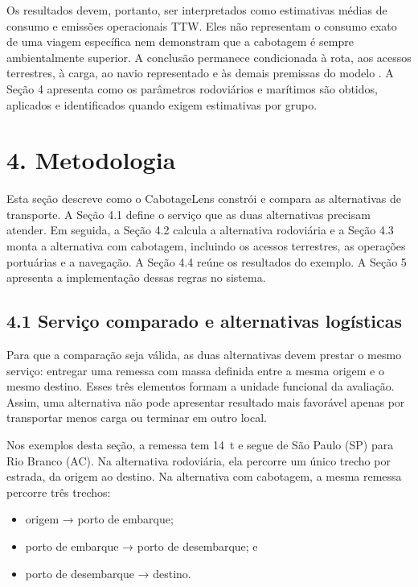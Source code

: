 \documentclass[brazil,]{article}
\providecommand{\tightlist}{%
  \setlength{\itemsep}{0pt}\setlength{\parskip}{0pt}}
\let\oldsection\section
\renewcommand{\section}{\Needspace{14\baselineskip}\oldsection}
\let\oldsubsection\subsection
\renewcommand{\subsection}{\Needspace{12\baselineskip}\oldsubsection}
\begin{document}
Os resultados devem, portanto, ser interpretados como estimativas médias
de consumo e emissões operacionais TTW. Eles não representam o consumo
exato de uma viagem específica nem demonstram que a cabotagem é sempre
ambientalmente superior. A conclusão permanece condicionada à rota, aos
acessos terrestres, à carga, ao navio representado e às demais premissas
do modelo \parencite{shortsea2019}. A Seção 4 apresenta como os
parâmetros rodoviários e marítimos são obtidos, aplicados e identificados
quando exigem estimativas por grupo.

\hypertarget{metodologia}{%
\section{4. Metodologia}\label{metodologia}}

Esta seção descreve como o CabotageLens constrói e compara as
alternativas de transporte. A Seção 4.1 define o serviço que as duas
alternativas precisam atender. Em seguida, a Seção 4.2 calcula a
alternativa rodoviária e a Seção 4.3 monta a alternativa com cabotagem,
incluindo os acessos terrestres, as operações portuárias e a navegação.
A Seção 4.4 reúne os resultados do exemplo. A Seção 5 apresenta a
implementação dessas regras no sistema.

\hypertarget{serviuxe7o-comparado-e-alternativas-loguxedsticas}{%
\subsection{4.1 Serviço comparado e alternativas
logísticas}\label{serviuxe7o-comparado-e-alternativas-loguxedsticas}}

Para que a comparação seja válida, as duas alternativas devem prestar o
mesmo serviço: entregar uma remessa com massa definida entre a mesma
origem e o mesmo destino. Esses três elementos formam a unidade
funcional da avaliação. Assim, uma alternativa não pode apresentar
resultado mais favorável apenas por transportar menos carga ou terminar
em outro local.

Nos exemplos desta seção, a remessa tem 14~t e segue de São Paulo (SP)
para Rio Branco (AC). Na alternativa rodoviária, ela percorre um único
trecho por estrada, da origem ao destino. Na alternativa com cabotagem,
a mesma remessa percorre três trechos:

\begin{itemize}
\tightlist
\item
  origem → porto de embarque;
\item
  porto de embarque → porto de desembarque; e
\item
  porto de desembarque → destino.
\end{itemize}
\end{document}
